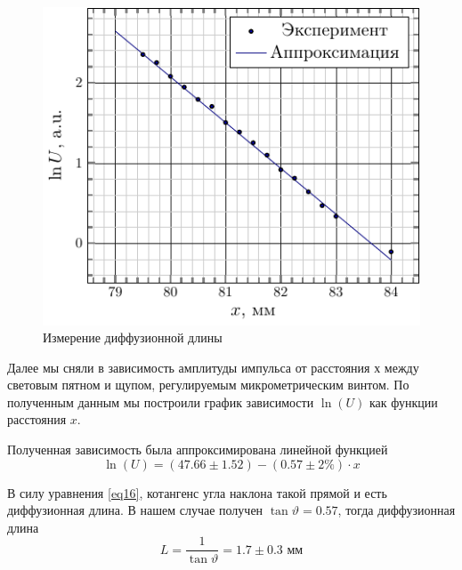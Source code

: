 \documentclass[a4paper,14pt]{extarticle}
\begin{document}
\begin{figure}[h!]
	\centering
	\includegraphics[]{plot/lnu_x.pdf}
	\caption{Измерение диффузионной длины}
	\label{fig:figure1020}
\end{figure}

Далее мы сняли в зависимость амплитуды импульса от расстояния $х$ между световым пятном и щупом, регулируемым микрометрическим винтом. По полученным данным мы построили график  зависимости $\ln(U)$ как функции расстояния $x$. 

Полученная зависимость была аппроксимирована линейной функцией
\begin{equation}
	\ln(U)=(47.66\pm1.52)-(0.57\pm2\%)\cdot x
\end{equation}


В силу уравнения \eqref{eq16}, котангенс угла наклона такой прямой и есть диффузионная длина. В нашем случае получен $\tan\vartheta=0.57$, тогда диффузионная длина
\begin{equation}
	L=\frac{1}{\tan\vartheta}=1.7\pm0.3 \text{ мм}
\end{equation}
\end{document}

